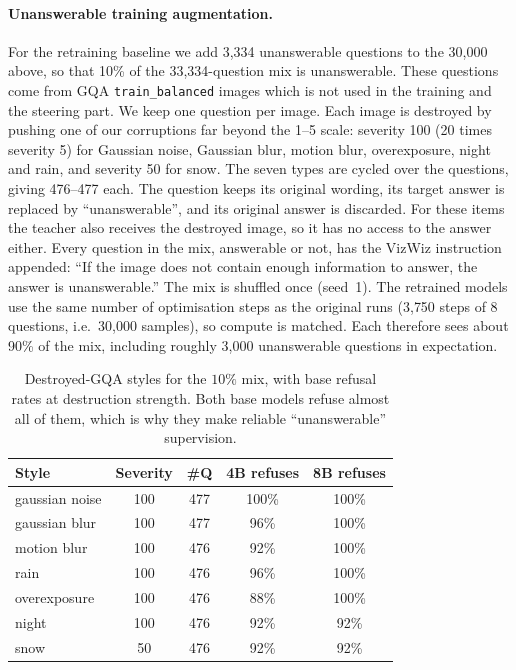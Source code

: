 \documentclass[10pt,twocolumn,letterpaper]{article}
\begin{document}
\paragraph{Unanswerable training augmentation.}
For the retraining baseline we add 3{,}334 unanswerable questions to the 30{,}000 above,
so that 10\% of the 33{,}334-question mix is unanswerable. These questions come from GQA
\texttt{train\_balanced} images which is not used in the training and the steering part. We keep one question per image. Each image is destroyed by
pushing one of our corruptions far beyond the 1--5 scale: severity 100 (20 times severity 5)
for Gaussian noise, Gaussian blur, motion blur, overexposure, night and rain, and severity 50
for snow. The seven types are cycled over the questions, giving 476--477 each. The question
keeps its original wording, its target answer is replaced by ``unanswerable'', and its
original answer is discarded. For these items the teacher also receives the destroyed image,
so it has no access to the answer either. Every question in the mix, answerable or not, has
the VizWiz instruction appended: ``If the image does not contain enough information to answer,
the answer is unanswerable.'' The mix is shuffled once (seed~1).
The retrained models use the same number of optimisation steps as the original runs
(3{,}750 steps of 8 questions, i.e.\ 30{,}000 samples), so compute is matched. Each therefore
sees about 90\% of the mix, including roughly 3{,}000 unanswerable questions in expectation.
\begin{table}[tb]
\centering
\small
\caption{Destroyed-GQA styles for the $10\%$ mix, with base refusal rates at destruction
strength. Both base models refuse almost all of them, which is why they make reliable
``unanswerable'' supervision.}
\label{tab:destroyed}
\begin{tabular}{@{}lcccc@{}}
\toprule
Style & Severity & \#Q & 4B refuses & 8B refuses \\
\midrule
gaussian noise & 100 & 477 & 100\% & 100\% \\
gaussian blur  & 100 & 477 & 96\%  & 100\% \\
motion blur    & 100 & 476 & 92\%  & 100\% \\
rain           & 100 & 476 & 96\%  & 100\% \\
overexposure   & 100 & 476 & 88\%  & 100\% \\
night          & 100 & 476 & 92\%  & 92\%  \\
snow           & 50  & 476 & 92\%  & 92\%  \\
\bottomrule
\end{tabular}
\end{table}
\end{document}
